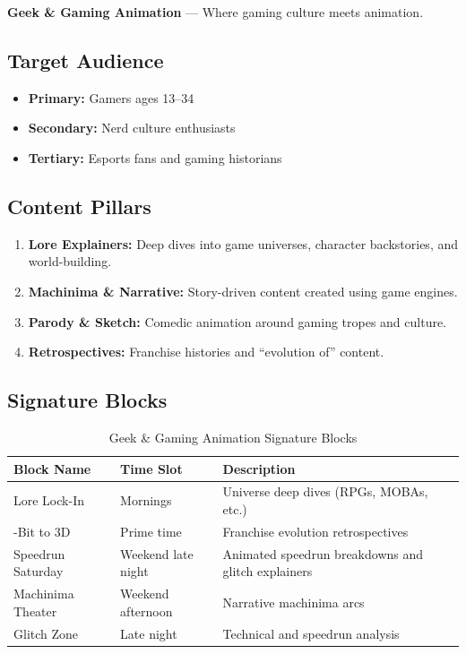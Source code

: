 \documentclass[12pt,letterpaper,twoside]{report}
\begin{document}
\begin{channelbox}[geekpurple]
\textbf{Geek \& Gaming Animation} --- Where gaming culture meets animation.
\end{channelbox}

\subsection{Target Audience}

\begin{itemize}[leftmargin=1.5cm]
    \item \textbf{Primary:} Gamers ages 13--34
    \item \textbf{Secondary:} Nerd culture enthusiasts
    \item \textbf{Tertiary:} Esports fans and gaming historians
\end{itemize}

\subsection{Content Pillars}

\begin{enumerate}[leftmargin=2cm]
    \item \textbf{Lore Explainers:} Deep dives into game universes, character backstories, and world-building.
    \item \textbf{Machinima \& Narrative:} Story-driven content created using game engines.
    \item \textbf{Parody \& Sketch:} Comedic animation around gaming tropes and culture.
    \item \textbf{Retrospectives:} Franchise histories and ``evolution of'' content.
\end{enumerate}

\subsection{Signature Blocks}

\begin{table}[H]
\centering
\caption{Geek \& Gaming Animation Signature Blocks}
\label{tab:gaming-blocks}
\begin{tabular}{@{}L{4cm}L{2.5cm}L{7cm}@{}}
\toprule
\textbf{Block Name} & \textbf{Time Slot} & \textbf{Description} \\
\midrule
Lore Lock-In & Mornings & Universe deep dives (RPGs, MOBAs, etc.) \\
-Bit to 3D & Prime time & Franchise evolution retrospectives \\
\addlinespace
Speedrun Saturday & Weekend late night & Animated speedrun breakdowns and glitch explainers \\
\addlinespace
Machinima Theater & Weekend afternoon & Narrative machinima arcs \\
\addlinespace
Glitch Zone & Late night & Technical and speedrun analysis \\
\bottomrule
\end{tabular}
\end{table}
\end{document}
